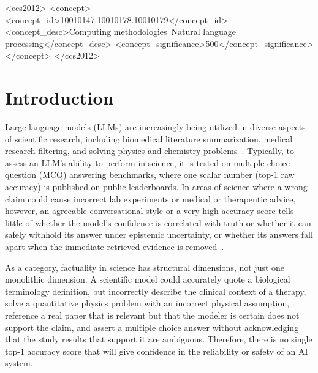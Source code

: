 \documentclass[sigconf,nonacm]{acmart}
\makeatletter
\DeclareRobustCommand{\_}{\ifmmode\nfss@text{\textunderscore}\else\textunderscore\allowbreak\fi}
\makeatother
\begin{document}
\begin{CCSXML}
<ccs2012>
   <concept>
       <concept_id>10010147.10010178.10010179</concept_id>
       <concept_desc>Computing methodologies~Natural language processing</concept_desc>
       <concept_significance>500</concept_significance>
   </concept>
</ccs2012>
\end{CCSXML}


\maketitle

\section{Introduction}
Large language models (LLMs) are increasingly being utilized in diverse aspects of scientific research, including biomedical literature summarization, medical research filtering, and solving physics and chemistry problems~\cite{hendrycks2021mmlu,jin2019pubmedqa}. Typically, to assess an LLM's ability to perform in science, it is tested on multiple choice question (MCQ) answering benchmarks, where one scalar number (top-1 raw accuracy) is published on public leaderboards. In areas of science where a wrong claim could cause incorrect lab experiments or medical or therapeutic advice, however, an agreeable conversational style or a very high accuracy score tells little of whether the model's confidence is correlated with truth or whether it can safely withhold its answer under epistemic uncertainty, or whether its answers fall apart when the immediate retrieved evidence is removed~\cite{guo2017calibration,geifman2017selective,kadavath2022language}.

As a category, factuality in science has structural dimensions, not just one monolithic dimension. A scientific model could accurately quote a biological terminology definition, but incorrectly describe the clinical context of a therapy, solve a quantitative physics problem with an incorrect physical assumption, reference a real paper that is relevant but that the modeler is certain does not support the claim, and assert a multiple choice answer without acknowledging that the study results that support it are ambiguous. Therefore, there is no single top-1 accuracy score that will give confidence in the reliability or safety of an AI system.
\end{document}
